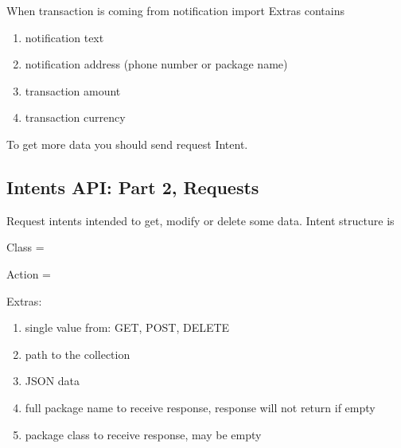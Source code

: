 \documentclass[a4paper,10pt,english]{sphinxmanual}
\begin{document}
\sphinxAtStartPar
When transaction is coming from notification import Extras contains
\begin{enumerate}
%
\item {} 
\sphinxAtStartPar
{} \sphinxhyphen{} notification text

\item {} 
\sphinxAtStartPar
{} \sphinxhyphen{} notification address (phone number or package name)

\item {} 
\sphinxAtStartPar
{} \sphinxhyphen{} transaction amount

\item {} 
\sphinxAtStartPar
{} \sphinxhyphen{} transaction currency

\end{enumerate}

\sphinxAtStartPar
To get more data you should send request Intent.


\subsection{Intents API: Part 2, Requests}
\label{\detokenize{api:intents-api-part-2-requests}}
\sphinxAtStartPar
Request intents intended to get, modify or delete some data. Intent structure is

\sphinxAtStartPar
Class = 

\sphinxAtStartPar
Action = 

\sphinxAtStartPar
Extras:
\begin{enumerate}
%
\item {} 
\sphinxAtStartPar
{} \sphinxhyphen{} single value from: GET, POST, DELETE

\item {} 
\sphinxAtStartPar
{} \sphinxhyphen{} path to the collection

\item {} 
\sphinxAtStartPar
{} \sphinxhyphen{} JSON data

\item {} 
\sphinxAtStartPar
{} \sphinxhyphen{} full package name to receive response, response will not return if empty

\item {} 
\sphinxAtStartPar
{} \sphinxhyphen{} package class to receive response, may be empty

\end{enumerate}
\end{document}
